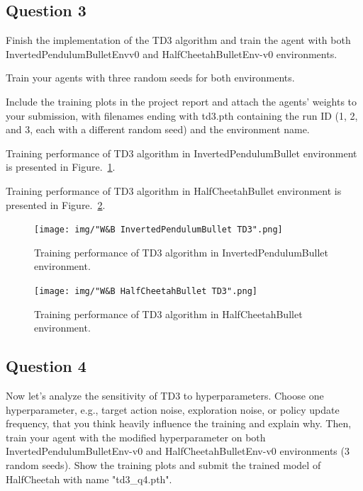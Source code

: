 \documentclass[12pt]{article}
\begin{document}
\subsection*{Question 3}

Finish the implementation of the TD3 algorithm and train the agent with both InvertedPendulumBulletEnvv0 and HalfCheetahBulletEnv-v0 environments.
\newline

\noindent
Train your agents with three random seeds for both environments. 
\newline

\noindent
Include the training plots in the project report and attach the agents’ weights to your submission, with filenames ending with td3.pth containing the run ID
(1, 2, and 3, each with a different random seed) and the environment name.
\newline

\noindent
Training performance of TD3 algorithm in InvertedPendulumBullet environment is presented in Figure.~\ref*{fig:fig1}.
\newline

Training performance of TD3 algorithm in HalfCheetahBullet environment is presented in Figure.~\ref*{fig:fig2}.
\newline

\pagebreak

\begin{figure}[pht] 
	\centering  %
    \texttt{[image: img/"W\&B InvertedPendulumBullet TD3".png]}
	\caption{Training performance of TD3 algorithm in InvertedPendulumBullet environment.}
	\label{fig:fig1}
\end{figure}

\begin{figure}[phb] 
	\centering  %
    \texttt{[image: img/"W\&B HalfCheetahBullet TD3".png]}
	\caption{Training performance of TD3 algorithm in HalfCheetahBullet environment.}
	\label{fig:fig2}
\end{figure}

\pagebreak

\subsection*{Question 4}

Now let’s analyze the sensitivity of TD3 to hyperparameters. Choose one hyperparameter, e.g.,
target action noise, exploration noise, or policy update frequency, that you think heavily influence the training and explain why. Then, train your agent with the modified hyperparameter on both InvertedPendulumBulletEnv-v0 and HalfCheetahBulletEnv-v0 environments (3 random seeds).
Show the training plots and submit the trained model of HalfCheetah with name "td3\_q4.pth".
\end{document}
